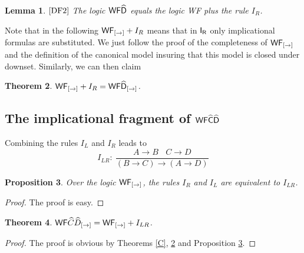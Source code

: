 \documentclass[12pt]{article}
\newtheorem{thm}{Theorem}[section]
\newtheorem{prop}[thm]{Proposition}
\newtheorem{lem}[thm]{Lemma}
\begin{document}
\begin{lem}$\cite{DF2}$
The logic ${\sf WF}\widehat{{\sf D}}  $ equals the logic {\sf WF}  plus the rule $ I_{R} $.
\end{lem}

Note that in the following ${\sf WF}_{[\rightarrow]}+I_{R}$   means that in $ {\sf I_{R}}$ only implicational formulas are substituted.
We just follow the proof of the completeness of $ {\sf WF_{[\rightarrow]}} $ and the definition of the canonical model insuring that this model is closed under downset. Similarly,  we can then claim

\begin{thm} \label{D}
${\sf WF}_{[\rightarrow]}+ I_{R}={\sf WF}\widehat{{\sf D}}_{[\rightarrow]}  $.
\end{thm}


\subsection{The implicational fragment of ${\sf WF}\widehat{{\sf C}}\widehat{{\sf D}} $}\label{WFCD}
Combining the rules $I_L$ and $I_R$ leads to
$$I_{LR}:~\dfrac{A\rightarrow B~~~~C\rightarrow D}{(B\rightarrow C)\rightarrow(A\rightarrow D)} $$

\begin{prop}\label{bh}
Over the logic  ${\sf WF}_{[\rightarrow]}  $, the rules $ I_{R} $ and $I_{L}  $ are equivalent to $ I_{LR} $.
\end{prop}
\begin{proof}
The proof is easy.
\end{proof}


\begin{thm}
$ {\sf WF}\widehat{C} \widehat{D}_{[\rightarrow]}= {\sf WF}_{[\rightarrow]} +I_{LR}  $.
\end{thm}
\begin{proof}
The proof is obvious by Theorems \ref{C}, \ref{D}  and Proposition \ref{bh}.
\end{proof}
\end{document}
